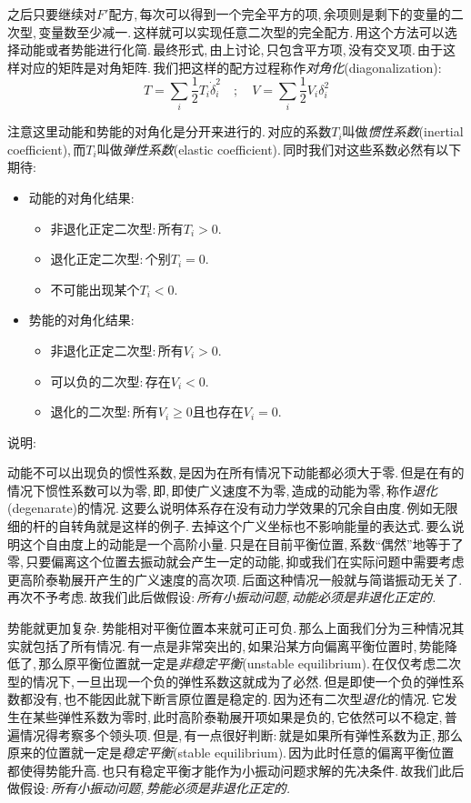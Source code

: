 之后只要继续对$F'$配方,\,每次可以得到一个完全平方的项,\,余项则是剩下的变量的二次型,\,变量数至少减一.\,这样就可以实现任意二次型的完全配方.\,用这个方法可以选择动能或者势能进行化简.\,最终形式,\,由上讨论,\,只包含平方项,\,没有交叉项.\,由于这样对应的矩阵是对角矩阵.\,我们把这样的配方过程称作\emph{对角化}(diagonalization):
\[T=\sum_i\frac{1}{2}T_i \dot{\delta}_i^2\quad ;\quad V=\sum_i\frac{1}{2}V_i \delta_i^2\]

注意这里动能和势能的对角化是分开来进行的.\,对应的系数$T_i$叫做\emph{惯性系数}(inertial coefficient),\,而$T_i$叫做\emph{弹性系数}(elastic coefficient).\,同时我们对这些系数必然有以下期待:

\begin{itemize}
	\item 动能的对角化结果:
		\begin{itemize}
			\item 非退化正定二次型:\,所有$T_i>0$.
			\item 退化正定二次型:\,个别$T_i=0$.
			\item 不可能出现某个$T_i<0$.
		\end{itemize}
	\item 势能的对角化结果:
		\begin{itemize}
			\item 非退化正定二次型:\,所有$V_i>0$.
			\item 可以负的二次型:\,存在$V_i<0$.
			\item 退化的二次型:\,所有$V_i\geq 0$且也存在$V_i= 0$.
		\end{itemize}
\end{itemize}

说明:

动能不可以出现负的惯性系数,\,是因为在所有情况下动能都必须大于零.\,但是在有的情况下惯性系数可以为零,\,即,\,即使广义速度不为零,\,造成的动能为零,\,称作\emph{退化}(degenarate)的情况.\,这要么说明体系存在没有动力学效果的冗余自由度.\,例如无限细的杆的自转角就是这样的例子.\,去掉这个广义坐标也不影响能量的表达式.\,要么说明这个自由度上的动能是一个高阶小量.\,只是在目前平衡位置,\,系数``偶然''地等于了零,\,只要偏离这个位置去振动就会产生一定的动能,\,抑或我们在实际问题中需要考虑更高阶泰勒展开产生的广义速度的高次项.\,后面这种情况一般就与简谐振动无关了.\,再次不予考虑.\,故我们此后做假设:\,\emph{所有小振动问题,\,动能必须是非退化正定的.}

势能就更加复杂.\,势能相对平衡位置本来就可正可负.\,那么上面我们分为三种情况其实就包括了所有情况.\,有一点是非常突出的,\,如果沿某方向偏离平衡位置时,\,势能降低了,\,那么原平衡位置就一定是\emph{非稳定平衡}(unstable equilibrium).\,在仅仅考虑二次型的情况下,\,一旦出现一个负的弹性系数这就成为了必然.\,但是即使一个负的弹性系数都没有,\,也不能因此就下断言原位置是稳定的.\,因为还有二次型\emph{退化}的情况.\,它发生在某些弹性系数为零时,\,此时高阶泰勒展开项如果是负的,\,它依然可以不稳定,\,普遍情况得考察多个领头项.\,但是,\,有一点很好判断:\,就是如果所有弹性系数为正,\,那么原来的位置就一定是\emph{稳定平衡}(stable equilibrium).\,因为此时任意的偏离平衡位置都使得势能升高.\,也只有稳定平衡才能作为小振动问题求解的先决条件.\,故我们此后做假设:\,\emph{所有小振动问题,\,势能必须是非退化正定的.}

